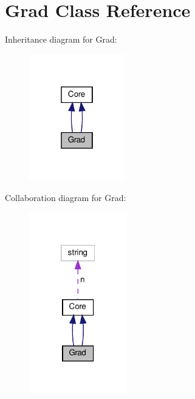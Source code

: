 \hypertarget{classGrad}{}\section{Grad Class Reference}
\label{classGrad}


Inheritance diagram for Grad\+:
\nopagebreak
\begin{figure}[H]
\begin{center}
\leavevmode
\includegraphics[width=118pt]{classGrad__inherit__graph}
\end{center}
\end{figure}


Collaboration diagram for Grad\+:
\nopagebreak
\begin{figure}[H]
\begin{center}
\leavevmode
\includegraphics[width=121pt]{classGrad__coll__graph}
\end{center}
\end{figure}
